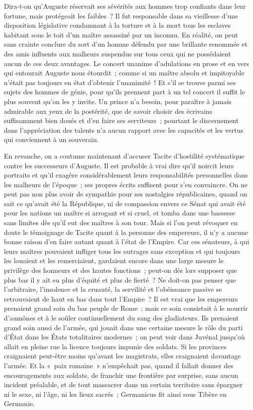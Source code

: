 \documentclass[french,twoside]{book} %
\begin{document}
Dira-t-on qu'Auguste réservait ses sévérités aux hommes trop confiants dans leur fortune, mais protégeait les faibles ? Il fut responsable dans sa vieil­lesse d'une disposition législative condamnant à la torture et à la mort tous les esclaves habitant sous le toit d'un maître assassiné par un inconnu. En réalité, on peut sans crainte conclure du sort d'un homme défendu par une brillante renommée et des amis influents aux malheurs suspendus sur tous ceux qui ne possédaient aucun de ces deux avantages. Le concert unanime d'adulations en prose et en vers qui entourait Auguste nous étourdit ; comme si un maître absolu et impitoyable n'était pas toujours en état d'obtenir l'unanimité ! Et s'il se trouve parmi ses sujets des hommes de génie, pour qu'ils prennent part à un tel concert il suffit le plus souvent qu'on les y invite. Un prince n'a besoin, pour paraître à jamais admirable aux yeux de la postérité, que de savoir choisir des écrivains suffisamment bien doués et d'en faire ses serviteurs ; pourtant le discernement dans l'appréciation des talents n'a aucun rapport avec les capa­cités et les vertus qui conviennent à un souverain.\par
En revanche, on a coutume maintenant d'accuser Tacite d'hostilité systé­matique contre les successeurs d'Auguste. Il est probable à vrai dire qu'il noircit leurs portraits et qu'il exagère considérablement leurs responsabilités personnelles dans les malheurs de l'époque ; ses propres écrits suffisent pour s'en convaincre. On ne peut pas non plus avoir de sympathie pour ses nostal­gies républicaines, quand on sait ce qu'avait été la République, ni de compassion envers ce Sénat qui avait été pour les nations un maître si arrogant et si cruel, et tomba dans une bassesse sans limites dès qu'il eut des maîtres à son tour. Mais si l'on peut révoquer en doute le témoignage de Tacite quant à la personne des empereurs, il n'y a aucune bonne raison d'en faire autant quant à l'état de l'Empire. Car ces sénateurs, à qui leurs maîtres pouvaient infliger tous les outrages sans exception et qui toujours les louaient et les remerciaient, gardaient encore dans une large mesure le privilège des honneurs et des hautes fonctions ; peut-on dès lors supposer que plus bas il y ait eu plus d'équité et plus de fierté ? Ne doit-on pas penser que l'arbitraire, l'insolence et la cruauté, la servilité et l'obéissance passive se retrouvaient de haut en bas dans tout l'Empire ? Il est vrai que les empereurs prenaient grand soin du bas peuple de Rome ; mais ce soin consistait à le nourrir d'aumônes et à le soûler continuel­lement du sang des gladiateurs. Ils prenaient grand soin aussi de l'armée, qui jouait dans une certaine mesure le rôle du parti d'État dans les États totalitaires modernes ; on peut voir dans Juvénal jusqu'où allait en pleine rue la licence toujours impunie des soldats. Si les provinces craignaient peut-être moins qu'avant les magistrats, elles craignaient davantage l'armée. Et la « paix ro­maine » n'empêchait pas, quand il fallait donner des encouragements aux soldats, de franchir une frontière par surprise, sans aucun incident préalable, et de tout massacrer dans un certain territoire sans épargner ni le sexe, ni l'âge, ni les lieux sacrés ; Germanicus fit ainsi sous Tibère en Germanie.\par
\end{document}

